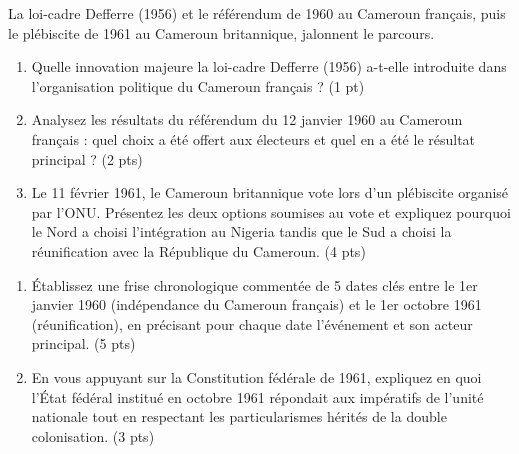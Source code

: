 \documentclass[11pt]{article}
\begin{document}
\begin{exercice}
La loi-cadre Defferre (1956) et le référendum de 1960 au Cameroun français, puis le plébiscite de 1961 au Cameroun britannique, jalonnent le parcours.

\begin{enumerate}
    \item Quelle innovation majeure la loi-cadre Defferre (1956) a-t-elle introduite dans l'organisation politique du Cameroun français ? (1 pt)
    \item Analysez les résultats du référendum du 12 janvier 1960 au Cameroun français : quel choix a été offert aux électeurs et quel en a été le résultat principal ? (2 pts)
    \item Le 11 février 1961, le Cameroun britannique vote lors d'un plébiscite organisé par l'ONU. Présentez les deux options soumises au vote et expliquez pourquoi le Nord a choisi l'intégration au Nigeria tandis que le Sud a choisi la réunification avec la République du Cameroun. (4 pts)
\end{enumerate}
\end{exercice}

\begin{exercice}
\begin{enumerate}
    \item Établissez une frise chronologique commentée de 5 dates clés entre le 1er janvier 1960 (indépendance du Cameroun français) et le 1er octobre 1961 (réunification), en précisant pour chaque date l'événement et son acteur principal. (5 pts)
    \item En vous appuyant sur la Constitution fédérale de 1961, expliquez en quoi l'État fédéral institué en octobre 1961 répondait aux impératifs de l'unité nationale tout en respectant les particularismes hérités de la double colonisation. (3 pts)
\end{enumerate}
\end{exercice}
\end{document}
